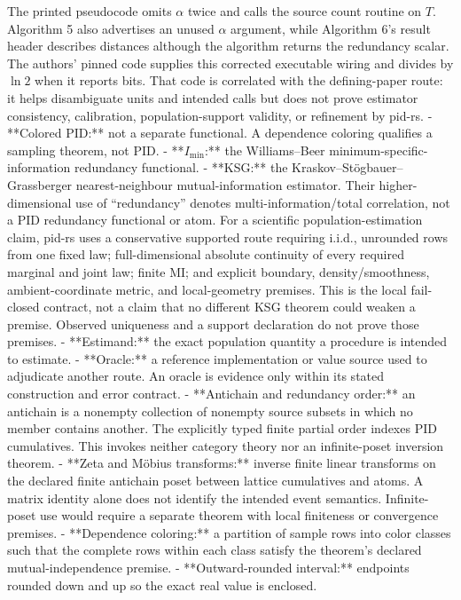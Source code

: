 \documentclass[11pt]{article}
\begin{document}
\begin{markdown}
  The printed pseudocode omits $\alpha$ twice and calls the source
  count routine on $T$. Algorithm 5 also advertises an unused $\alpha$ argument, while Algorithm
  6's result header describes distances although the algorithm returns the redundancy scalar. The
  authors' pinned code supplies this corrected executable wiring and divides by $\ln 2$ when it
  reports bits. That code is correlated with the defining-paper route: it helps disambiguate units
  and intended calls but does not prove estimator consistency, calibration, population-support
  validity, or refinement by pid-rs.
- **Colored PID:** not a separate functional. A dependence coloring qualifies a sampling theorem,
  not PID.
- **$I_{\min}$:** the Williams--Beer minimum-specific-information redundancy functional.
- **KSG:** the Kraskov--Stögbauer--Grassberger nearest-neighbour mutual-information estimator.
  Their higher-dimensional use of “redundancy” denotes multi-information/total correlation, not
  a PID redundancy functional or atom. For a scientific population-estimation claim, pid-rs uses
  a conservative supported route requiring i.i.d., unrounded rows from one fixed law;
  full-dimensional absolute continuity of every required marginal and joint law; finite MI; and
  explicit boundary, density/smoothness, ambient-coordinate metric, and local-geometry premises.
  This is the local fail-closed contract, not a claim that no different KSG theorem could weaken a
  premise. Observed uniqueness and a support declaration do not prove those premises.
- **Estimand:** the exact population quantity a procedure is intended to estimate.
- **Oracle:** a reference implementation or value source used to adjudicate another route. An
  oracle is evidence only within its stated construction and error contract.
- **Antichain and redundancy order:** an antichain is a nonempty collection of nonempty source
  subsets in which no member contains another. The explicitly typed finite partial order indexes
  PID cumulatives. This invokes neither category theory nor an infinite-poset inversion theorem.
- **Zeta and Möbius transforms:** inverse finite linear transforms on the declared finite antichain
  poset between lattice cumulatives and atoms. A matrix identity alone does not identify the
  intended event semantics. Infinite-poset use would require a separate theorem with local
  finiteness or convergence premises.
- **Dependence coloring:** a partition of sample rows into color classes such that the complete
  rows within each class satisfy the theorem's declared mutual-independence premise.
- **Outward-rounded interval:** endpoints rounded down and up so the exact real value is enclosed.

\end{markdown}
\end{document}

